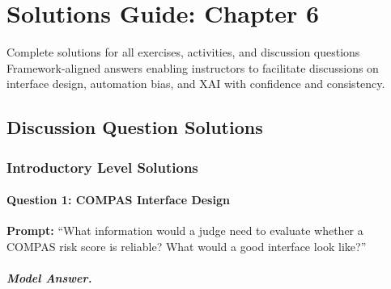 
\chapter{Solutions Guide: Chapter 6}
\label{ch:solutions-ch06}

\begin{chapterquote}{Complete solutions for all exercises, activities, and discussion questions}
Framework-aligned answers enabling instructors to facilitate discussions on interface design, automation bias, and XAI with confidence and consistency.
\end{chapterquote}

\section{Discussion Question Solutions}

\subsection{Introductory Level Solutions}

\subsubsection{Question 1: COMPAS Interface Design}

\textbf{Prompt:} ``What information would a judge need to evaluate whether a COMPAS risk score is reliable? What would a good interface look like?''

\paragraph{Model Answer.}

